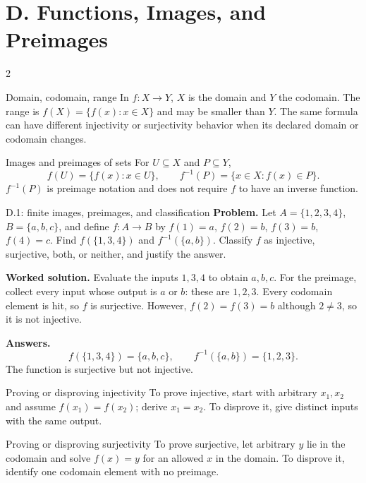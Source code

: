 \documentclass[10pt]{article}
\begin{document}
\section*{D. Functions, Images, and Preimages}
\begin{multicols}{2}
\begin{definitionbox}{Domain, codomain, range}
In $f:X\to Y$, $X$ is the domain and $Y$ the codomain. The range is
$f(X)=\{f(x):x\in X\}$ and may be smaller than $Y$. The same formula can have
different injectivity or surjectivity behavior when its declared domain or
codomain changes.
\end{definitionbox}

\begin{definitionbox}{Images and preimages of sets}
For $U\subseteq X$ and $P\subseteq Y$,
\[
f(U)=\{f(x):x\in U\},
\qquad
f^{-1}(P)=\{x\in X:f(x)\in P\}.
\]
$f^{-1}(P)$ is preimage notation and does not require $f$ to have an inverse
function.
\end{definitionbox}

\begin{workedbox}{D.1: finite images, preimages, and classification}
\textbf{Problem.} Let $A=\{1,2,3,4\}$, $B=\{a,b,c\}$, and define
$f:A\to B$ by $f(1)=a$, $f(2)=b$, $f(3)=b$, $f(4)=c$.
Find $f(\{1,3,4\})$ and $f^{-1}(\{a,b\})$. Classify $f$ as injective,
surjective, both, or neither, and justify the answer.

\textbf{Worked solution.} Evaluate the inputs $1,3,4$ to obtain $a,b,c$.
For the preimage, collect every input whose output is $a$ or $b$: these are
$1,2,3$. Every codomain element is hit, so $f$ is surjective. However,
$f(2)=f(3)=b$ although $2\ne3$, so it is not injective.

\textbf{Answers.}
\[
f(\{1,3,4\})=\{a,b,c\},\qquad
f^{-1}(\{a,b\})=\{1,2,3\}.
\]
The function is surjective but not injective.
\end{workedbox}

\begin{methodbox}{Proving or disproving injectivity}
To prove injective, start with arbitrary $x_1,x_2$ and assume
$f(x_1)=f(x_2)$; derive $x_1=x_2$. To disprove it, give distinct inputs with
the same output.
\end{methodbox}


\begin{methodbox}{Proving or disproving surjectivity}
To prove surjective, let arbitrary $y$ lie in the codomain and solve
$f(x)=y$ for an allowed $x$ in the domain. To disprove it, identify one
codomain element with no preimage.
\end{methodbox}


\end{multicols}
\end{document}
